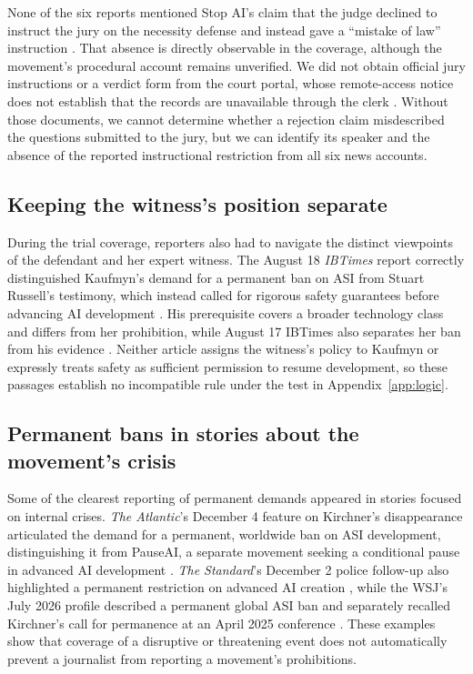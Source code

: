 \documentclass[11pt]{article}
\begin{document}
None of the six reports mentioned Stop AI's claim that the judge declined to instruct the jury on the necessity defense and instead gave a ``mistake of law'' instruction \citep{stoptrial}. That absence is directly observable in the coverage, although the movement's procedural account remains unverified. We did not obtain official jury instructions or a verdict form from the court portal, whose remote-access notice does not establish that the records are unavailable through the clerk \citep{courtaccess}. Without those documents, we cannot determine whether a rejection claim misdescribed the questions submitted to the jury, but we can identify its speaker and the absence of the reported instructional restriction from all six news accounts.

\subsection{Keeping the witness's position separate}
During the trial coverage, reporters also had to navigate the distinct viewpoints of the defendant and her expert witness. The August 18 \textit{IBTimes} report correctly distinguished Kaufmyn's demand for a permanent ban on ASI from Stuart Russell's testimony, which instead called for rigorous safety guarantees before advancing AI development \citep{stoptrial,ib18}. His prerequisite covers a broader technology class and differs from her prohibition, while August 17 IBTimes also separates her ban from his evidence \citep{ib17}. Neither article assigns the witness's policy to Kaufmyn or expressly treats safety as sufficient permission to resume development, so these passages establish no incompatible rule under the test in Appendix~\ref{app:logic}.

\subsection{Permanent bans in stories about the movement's crisis}
Some of the clearest reporting of permanent demands appeared in stories focused on internal crises. \textit{The Atlantic}'s December 4 feature on Kirchner's disappearance articulated the demand for a permanent, worldwide ban on ASI development, distinguishing it from PauseAI, a separate movement seeking a conditional pause in advanced AI development \citep{atlantic}. \textit{The Standard}'s December 2 police follow-up also highlighted a permanent restriction on advanced AI creation \citep{standardpolice}, while the WSJ's July 2026 profile described a permanent global ASI ban and separately recalled Kirchner's call for permanence at an April 2025 conference \citep{wsj}. These examples show that coverage of a disruptive or threatening event does not automatically prevent a journalist from reporting a movement's prohibitions.
\end{document}
